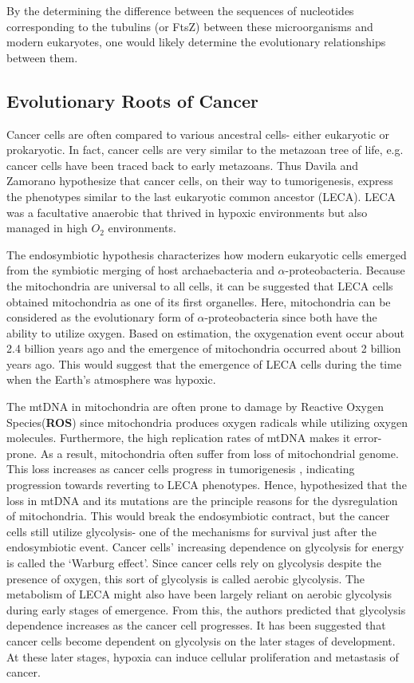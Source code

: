 \documentclass[letterpaper,final,times]{cas-dc}
\numberwithin{equation}{section}
\begin{document}
By the determining the difference between the sequences of nucleotides corresponding to the tubulins (or FtsZ) between these microorganisms and modern eukaryotes, one would likely determine the evolutionary relationships between them.

\subsection{Evolutionary Roots of Cancer}
Cancer cells are often compared to various ancestral cells- either eukaryotic or prokaryotic. In fact, cancer cells are very similar to the metazoan tree of life\citep{103}, e.g. cancer cells have been traced back to early metazoans\citep{104}. Thus Davila and Zamorano hypothesize that cancer cells, on their way to tumorigenesis, express the phenotypes similar to the last eukaryotic common ancestor (LECA). LECA was a facultative anaerobic that thrived in hypoxic environments but also managed in high $O_2$ environments.

The endosymbiotic hypothesis characterizes how modern eukaryotic cells emerged from the symbiotic merging of host archaebacteria\citep{105} and $\alpha$-proteobacteria\citep{106}. Because the mitochondria are universal to all cells, it can be suggested that LECA cells obtained mitochondria as one of its first organelles. Here, mitochondria can be considered as the evolutionary form of $\alpha$-proteobacteria since both have the ability to utilize oxygen. Based on estimation, the oxygenation event occur about 2.4 billion years ago and the emergence of mitochondria occurred about 2 billion years ago\citep{108}. This would suggest that the emergence of LECA cells during the time when the Earth’s atmosphere was hypoxic\citep{103}.

The mtDNA in mitochondria are often prone to damage by Reactive Oxygen Species(\textbf{ROS}) since mitochondria produces oxygen radicals while utilizing oxygen molecules. Furthermore, the high replication rates of mtDNA\citep{107} makes it error-prone. As a result, mitochondria often suffer from loss of mitochondrial genome. This loss increases as cancer cells progress in tumorigenesis \citep{109}, indicating progression towards reverting to LECA phenotypes. Hence, \citet{103} hypothesized that the loss in mtDNA and its mutations are the principle reasons for the dysregulation of mitochondria. This would break the endosymbiotic contract, but the cancer cells still utilize glycolysis- one of the mechanisms for survival just after the endosymbiotic event. Cancer cells’ increasing dependence on glycolysis for energy is called
the ‘Warburg effect’. Since cancer cells rely on glycolysis despite the presence of oxygen, this sort of glycolysis is called aerobic glycolysis. The metabolism of LECA might also have been largely reliant on aerobic glycolysis during early stages of emergence\citep{103}. From this, the authors\citep{103} predicted that glycolysis dependence increases as the cancer cell progresses. It has been suggested that cancer cells become dependent on glycolysis on the later stages of development. At these later stages, hypoxia can induce cellular proliferation and metastasis of cancer\citep{103}.
\end{document}
